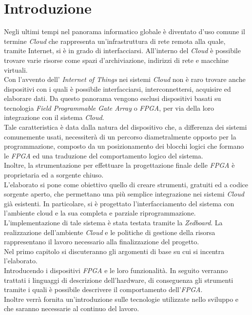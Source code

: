\chapter{Introduzione}
\label{chap:intro}
Negli ultimi tempi nel panorama informatico globale è diventato d'uso comune il termine \textit{Cloud} che rappresenta un'infrastruttura di rete remota alla quale, tramite Internet, si è in grado di interfacciarsi. All'interno del \textit{Cloud} è possibile trovare varie risorse come spazi d'archiviazione, indirizzi di rete e macchine virtuali.\\
Con l'avvento dell' \textit{Internet of Things} nei sistemi \textit{Cloud} non è raro trovare anche dispositivi con i quali è possibile interfacciarsi, interconnettersi, acquisire ed elaborare dati. Da questo panorama vengono esclusi dispositivi basati su tecnologia \textit{Field Programmable Gate Array} o \textit{FPGA}, per via della loro integrazione con il sistema \textit{Cloud}.\\
Tale caratteristica è data dalla natura del dispositivo che, a differenza dei sistemi comunemente usati, necessiterà di un percorso diametralmente opposto per la programmazione, composto da un posizionamento dei blocchi logici che formano le \textit{FPGA} ed una traduzione del comportamento logico del sistema.\\
Inoltre, la strumentazione per effettuare la progettazione finale delle \textit{FPGA} è proprietaria ed a sorgente chiuso.\\
L'elaborato si pone come obiettivo quello di creare strumenti, gratuiti ed a codice sorgente aperto, che permettano una più semplice integrazione nei sistemi \textit{Cloud} già esistenti.
In particolare, si è progettato l'interfacciamento del sistema con l'ambiente cloud e la sua completa e parziale riprogrammazione.
L'implementazione di tale sistema è stata testata tramite la \textit{Zedboard}.
La realizzazione dell'ambiente \textit{Cloud} e le politiche di gestione della risorsa rappresentano il lavoro necessario alla finalizzazione del progetto.\\
Nel primo capitolo si discuteranno gli argomenti di base su cui si incentra l'elaborato.\\
Introducendo i dispositivi \textit{FPGA} e le loro funzionalità. In seguito verranno trattati i linguaggi di descrizione dell'hardware, di conseguenza gli strumenti tramite i quali è possibile descrivere il comportamento dell'\textit{FPGA}.\\
Inoltre verrà fornita un'introduzione sulle tecnologie utilizzate nello sviluppo e che saranno necessarie al continuo del lavoro.\\

